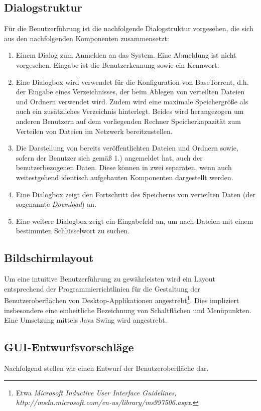   \subsection{Dialogstruktur}
  Für die Benutzerführung ist die nachfolgende Dialogstruktur vorgesehen, die sich aus 
  den nachfolgenden Komponenten zusammensetzt:
  \begin{enumerate}[1.)]
   \item Einem Dialog zum Anmelden an das System. Eine Abmeldung ist nicht vorgesehen. Eingabe ist die
Benutzerkennung sowie ein Kennwort.

   \item Eine Dialogbox wird verwendet für die Konfiguration von BaseTorrent, d.h. der Eingabe eines Verzeichnisses,
der beim Ablegen von verteilten Dateien und Ordnern verwendet wird. Zudem wird eine maximale Speichergröße
  als auch ein zusätzliches Verzeichnis hinterlegt. Beides wird herangezogen um anderen Benutzern auf dem
  vorliegenden Rechner Speicherkapazität zum Verteilen von Dateien im Netzwerk bereitzustellen.

   \item Die Darstellung von bereits veröffentlichten Dateien und Ordnern sowie, sofern der Benutzer sich gemäß 1.)
  angemeldet hat, auch der benutzerbezogenen Daten.  Diese können in zwei separaten, wenn auch weitestgehend
identisch aufgebauten Komponenten dargestellt werden.

   \item Eine Dialogbox zeigt den Fortschritt des Speicherns von verteilten Daten (der sogenannte \emph{Download}) an.
   \item Eine weitere Dialogbox zeigt ein Eingabefeld an, um nach Dateien mit einem bestimmten Schlüsselwort zu suchen.
  \end{enumerate}

  \subsection{Bildschirmlayout}
  Um eine intuitive Benutzerführung zu gewährleisten wird ein Layout entsprechend 
  der Programmierrichtlinien für die Gestaltung der Benutzeroberflächen von  
  Desktop-Applikationen angestrebt\footnote{Etwa \emph{Microsoft Inductive User Interface Guidelines, http://msdn.microsoft.com/en-us/library/ms997506.aspx}.}. Dies impliziert insbesondere eine einheitliche
Bezeichnung von Schaltflächen und Menüpunkten. Eine Umsetzung mittels Java Swing wird angestrebt. 

 \subsection{GUI-Entwurfsvorschläge}
  Nachfolgend stellen wir einen  Entwurf der Benutzeroberfläche dar.

